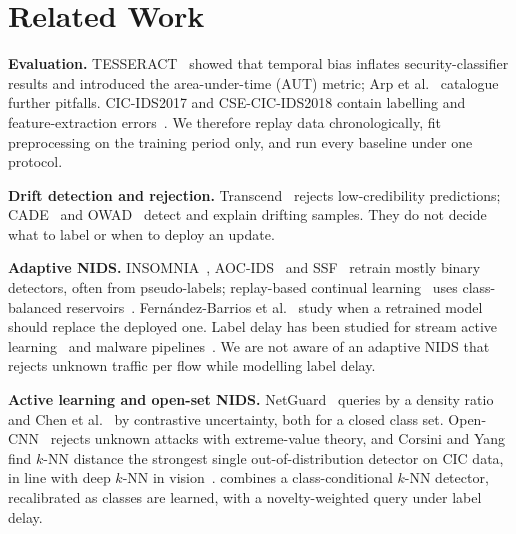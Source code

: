\section{Related Work}
\label{sec:related}

\textbf{Evaluation.} TESSERACT~\cite{pendlebury2019tesseract} showed that temporal bias inflates
security-classifier results and introduced the area-under-time (AUT) metric; Arp et al.~\cite{arp2022dos}
catalogue further pitfalls. CIC-IDS2017 and CSE-CIC-IDS2018 contain labelling and feature-extraction
errors~\cite{engelen2021troubleshooting,liu2022error}. We therefore replay data chronologically, fit
preprocessing on the training period only, and run every baseline under one protocol.

\textbf{Drift detection and rejection.} Transcend~\cite{jordaney2017transcend,barbero2022transcending} rejects
low-credibility predictions; CADE~\cite{yang2021cade} and OWAD~\cite{han2023owad} detect and explain drifting
samples. They do not decide what to label or when to deploy an update.

\textbf{Adaptive NIDS.} INSOMNIA~\cite{andresini2021insomnia}, AOC-IDS~\cite{zhang2024aoc} and
SSF~\cite{zhang2025ssf} retrain mostly binary detectors, often from pseudo-labels; replay-based continual
learning~\cite{amalapuram2023augmented} uses class-balanced reservoirs~\cite{chrysakis2020online}.
Fern{\'a}ndez-Barrios et al.~\cite{fernandezbarrios2026candidate} study when a retrained model should replace the
deployed one. Label delay has been studied for stream active learning~\cite{pham2022stream} and malware
pipelines~\cite{botacin2025label}. We are not aware of an adaptive NIDS that rejects unknown traffic per flow
while modelling label delay.

\textbf{Active learning and open-set NIDS.} NetGuard~\cite{gupta2025netguard} queries by a density ratio and
Chen et al.~\cite{chen2023continuous} by contrastive uncertainty, both for a closed class set.
Open-CNN~\cite{zhang2020osr} rejects unknown attacks with extreme-value theory, and Corsini and
Yang~\cite{corsini2023ood} find $k$-NN distance the strongest single out-of-distribution detector on CIC data, in
line with deep $k$-NN in vision~\cite{sun2022knn}. \nova{} combines a class-conditional $k$-NN detector,
recalibrated as classes are learned, with a novelty-weighted query under label delay.
